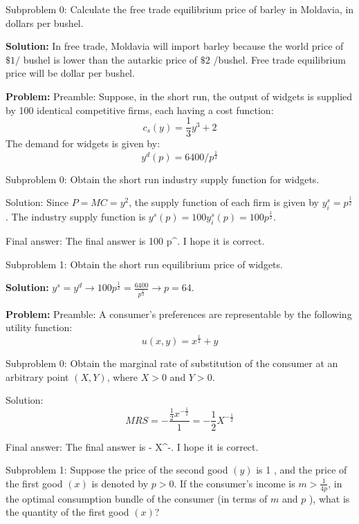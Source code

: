 \documentclass[10pt]{article}
\begin{document}
Subproblem 0: Calculate the free trade equilibrium price of barley in Moldavia, in dollars per bushel. 


\textbf{Solution:}
In free trade, Moldavia will import barley because the world price of $\$ 1 /$ bushel is lower than the autarkic price of $\$ 2$ /bushel. Free trade equilibrium price will be  dollar per bushel.


\textbf{Problem:}
Preamble: Suppose, in the short run, the output of widgets is supplied by 100 identical competitive firms, each having a cost function:
\[
c_{s}(y)=\frac{1}{3} y^{3}+2
\]
The demand for widgets is given by:
\[
y^{d}(p)=6400 / p^{\frac{1}{2}}
\]

Subproblem 0: Obtain the short run industry supply function for widgets.


Solution: Since $P=M C=y^{2}$, the supply function of each firm is given by $y_{i}^{s}=p^{\frac{1}{2}}$. 
The industry supply function is $y^{s}(p)=100 y_{i}^{s}(p)=\boxed{100 p^{\frac{1}{2}}}$.

Final answer: The final answer is 100 p^{}. I hope it is correct.

Subproblem 1: Obtain the short run equilibrium price of widgets.


\textbf{Solution:}
$y^{s}=y^{d} \longrightarrow 100 p^{\frac{1}{2}}=\frac{6400}{p^{\frac{1}{2}}} \longrightarrow p=\boxed{64}$. 


\textbf{Problem:}
Preamble: A consumer's preferences are representable by the following utility function:
\[
  u(x, y)=x^{\frac{1}{2}}+y
\]

Subproblem 0: Obtain the marginal rate of substitution of the consumer at an arbitrary point $(X,Y)$, where $X>0$ and $Y>0$.


Solution: \[ M R S=-\frac{\frac{1}{2} x^{-\frac{1}{2}}}{1}=\boxed{-\frac{1}{2} X^{-\frac{1}{2}}} \]

Final answer: The final answer is - X^{-}. I hope it is correct.

Subproblem 1: Suppose the price of the second good $(y)$ is 1 , and the price of the first good $(x)$ is denoted by $p>0$. If the consumer's income is $m>\frac{1}{4p}$, in the optimal consumption bundle of the consumer (in terms of $m$ and $p$ ), what is the quantity of the first good $(x)$?
\end{document}
